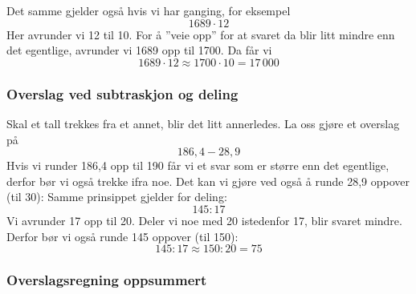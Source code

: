 \linje
Det samme gjelder også hvis vi har ganging, for eksempel
\[ 1689\cdot12 \]
Her avrunder vi 12 til 10. For å ''veie opp'' for at svaret da blir litt mindre enn det egentlige, avrunder vi 1689 opp til 1700. Da får vi
\[ 1689\cdot12\approx 1700\cdot 10 =17\,000 \]
\subsubsection{Overslag ved subtraskjon og deling}
Skal et tall trekkes fra et annet, blir det litt annerledes. La oss gjøre et overslag på
\[ 186,4-28,9 \]
Hvis vi runder 186,4 opp til 190 får vi et svar som er større enn det egentlige, derfor bør vi også trekke ifra noe. Det kan vi gjøre ved også å runde 28,9 oppover (til 30):
Samme prinsippet gjelder for deling: 
\[ 145:17 \]
Vi avrunder 17 opp til 20. Deler vi noe med 20 istedenfor 17, blir svaret mindre. Derfor bør vi også runde 145 oppover (til 150):
\[ 145:17 \approx 150:20 = 75 \]

\subsubsection{Overslagsregning oppsummert}
 \vsk

